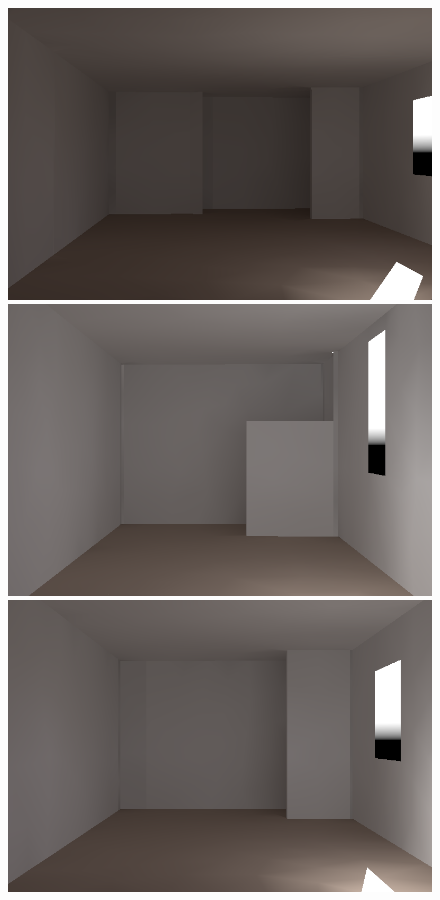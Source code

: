 \begin{figure}[t]
\begin{small}
\includegraphics[width=\figwidth]{p2r_063_camera_dark_march_crop.png} \hfill    %
\includegraphics[width=\figwidth]{p2r_050_camera_dark_march_crop.png} \hfill    %
\includegraphics[width=\figwidth]{p2r_070_camera_dark_march_crop.png} \hfill         %

\end{small}
\end{figure}
